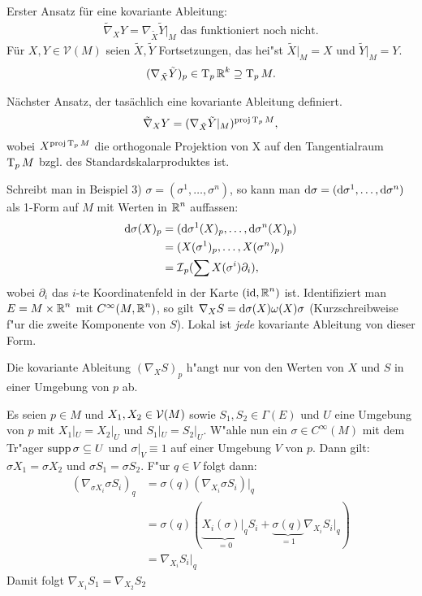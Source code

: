 \begin{bsp}
\begin{enumerate}[label=\arabic*),leftmargin=*]
	Erster Ansatz für eine kovariante Ableitung:
	\begin{align*}
		\tilde \nabla_XY = \nabla_{\tilde X}\tilde Y|_M \text{ das funktioniert noch nicht.}
	\end{align*}
	Für $X,Y \in \mathcal V(M)$ seien $\tilde X, \tilde Y$ Fortsetzungen, das hei"st $\tilde X|_M = X$ und $\tilde Y|_M = Y$.
	\begin{align*}
		(\nabla_{\tilde X}\tilde Y)_p \in \operatorname{T}_p\operatorname{\mathbb{R}}^k \supseteq \operatorname{T}_pM.
	\end{align*}

	Nächster Ansatz, der tasächlich eine kovariante Ableitung definiert.
	\begin{align*}
		\tilde \nabla_XY = (\nabla_{\tilde X}\tilde Y|_M)^{\text{proj}\operatorname{T}_pM},
	\end{align*}
	wobei $X^{\text{proj}\operatorname{T}_pM}$ die orthogonale Projektion von X auf den Tangentialraum $\operatorname{T}_pM$ bzgl. des Standardskalarproduktes ist.
\end{enumerate}\end{bsp}

Schreibt man in Beispiel 3) $\sigma = ( \sigma^1, \ldots ,\sigma^n)$, so kann man $\mathrm{d} \sigma = (\mathrm{d} \sigma^1,\ldots ,\mathrm{d}\sigma^n)$ als 1-Form auf $M$ mit Werten in $\operatorname{\mathbb{R}}^n$ auffassen:
	\begin{align*}
		\mathrm{d} \sigma(X)_p &= (\mathrm{d} \sigma^1(X)_p,\ldots , \mathrm{d} \sigma^n(X)_p)\\
		&= (X(\sigma^1)_p,\ldots ,X(\sigma^n)_p)\\
		&= \operatorname{\mathcal{I}}_p(\sum X(\sigma^{i}) \partial_i),
	\end{align*}
	wobei $\partial_i$ das $i$-te Koordinatenfeld in der Karte $(\operatorname{id}, \operatorname{\mathbb{R}}^n)$ ist. Identifiziert man $E = M \times \operatorname{\mathbb{R}}^n$ mit $C^{\infty}(M, \operatorname{\mathbb{R}}^n)$, so gilt $\nabla_X S = \mathrm{d} \sigma(X) \omega(X) \sigma$ (Kurzschreibweise f"ur die zweite Komponente von $S$). Lokal ist \emph{jede} kovariante Ableitung von dieser Form.

\begin{Lemma}
Die kovariante Ableitung $(\nabla_XS)_p$ h"angt nur von den Werten von $X$ und $S$ in einer Umgebung von $p$ ab.
\end{Lemma}

\begin{bew}
Es seien $p \in M$ und $X_1, X_2 \in \operatorname{\mathcal{V}}(M)$ sowie $S_1, S_2 \in \Gamma(E)$ und $U$ eine Umgebung von $p$ mit $X_1|_U = X_2|_U$ und $S_1|_U = S_2|_U$. W"ahle nun ein $\sigma \in C^{\infty}(M)$ mit dem Tr"ager $\operatorname{supp} \sigma \subseteq U$ und $\sigma|_V \equiv 1$ auf einer Umgebung $V$ von $p$. Dann gilt: $\sigma X_1 = \sigma X_2$ und $\sigma S_1 = \sigma S_2$. F"ur $q \in V$ folgt dann:
\begin{align*}
	(\nabla_{\sigma X_i} \sigma S_i)_q &= \sigma(q)(\nabla_{X_i} \sigma S_i)|_q\\
	&= \sigma(q)(\underbrace{X_i(\sigma)|_q}_{=0} S_i + \underbrace{\sigma(q)}_{=1}\nabla_{X_i} S_i|_q)\\
	&= \nabla_{X_i} S_i|_q
\end{align*}
Damit folgt $\nabla_{X_1} S_1 = \nabla_{X_2} S_2$
\end{bew}

